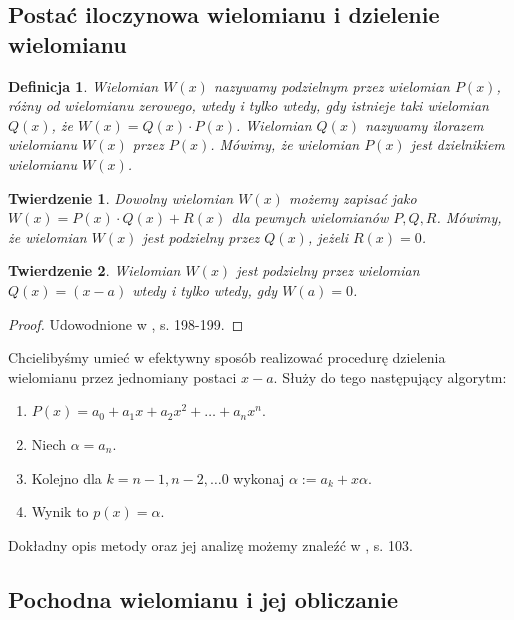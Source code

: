 \documentclass{article}
\newtheorem{thm}{Twierdzenie}
\newtheorem{definicja}{Definicja}
\begin{document}
\subsection{Postać iloczynowa wielomianu i dzielenie wielomianu}


\begin{definicja}
Wielomian $W(x)$ nazywamy podzielnym przez wielomian $P(x)$, różny od wielomianu zerowego, wtedy i tylko wtedy, gdy istnieje taki wielomian $Q(x)$, że $W(x) = Q(x) \cdot P(x)$. Wielomian $Q(x)$ nazywamy ilorazem wielomianu $W(x)$ przez $P(x)$. Mówimy, że wielomian $P(x)$ jest dzielnikiem wielomianu $W(x)$.
\end{definicja}


\begin{thm}
Dowolny wielomian $W(x)$ możemy zapisać jako $W(x) = P(x) \cdot Q(x) + R(x)$ dla pewnych wielomianów $P, Q, R$. Mówimy, że wielomian $W(x)$ jest podzielny przez $Q(x)$, jeżeli $R(x) = 0$. 
\end{thm}

\begin{thm}
Wielomian $W(x)$ jest podzielny przez wielomian $Q(x) = (x-a)$ wtedy i tylko wtedy, gdy $W(a) = 0$.	
\end{thm}

\begin{proof}
Udowodnione w \cite{kostrikin}, s. 198-199.
\end{proof}

Chcielibyśmy umieć w efektywny sposób realizować procedurę dzielenia wielomianu przez jednomiany postaci $x-a$. Służy do tego następujący algorytm:

\begin{enumerate}
\item $P(x) = a_0 + a_1 x + a_2 x^2 + \ldots + a_n x^n$.
\item Niech $\alpha = a_n$.
\item Kolejno dla $k = n-1, n-2, \ldots 0$ wykonaj $\alpha := a_k + x \alpha$.
\item Wynik to $p(x) = \alpha$.
\end{enumerate}

Dokładny opis metody oraz jej analizę możemy znaleźć w \cite{kincaid}, s. 103.\\

\subsection{Pochodna wielomianu i jej obliczanie}
\end{document}
